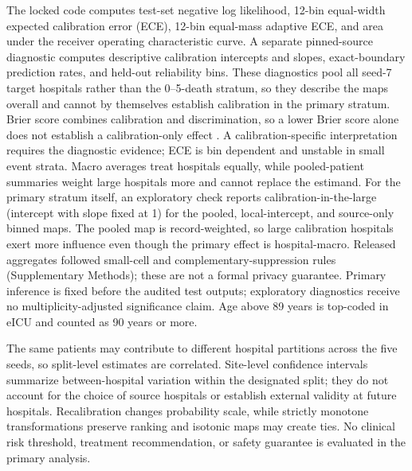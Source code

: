 \documentclass[11pt]{article}
\begin{document}
The locked code computes test-set negative log likelihood, 12-bin equal-width expected calibration error (ECE), 12-bin equal-mass adaptive ECE, and area under the receiver operating characteristic curve. A separate pinned-source diagnostic computes descriptive calibration intercepts and slopes, exact-boundary prediction rates, and held-out reliability bins. These diagnostics pool all seed-7 target hospitals rather than the 0--5-death stratum, so they describe the maps overall and cannot by themselves establish calibration in the primary stratum. Brier score combines calibration and discrimination, so a lower Brier score alone does not establish a calibration-only effect \cite{r3}. A calibration-specific interpretation requires the diagnostic evidence; ECE is bin dependent and unstable in small event strata. Macro averages treat hospitals equally, while pooled-patient summaries weight large hospitals more and cannot replace the estimand. For the primary stratum itself, an exploratory check reports calibration-in-the-large (intercept with slope fixed at 1)\cite{vancalster2016} for the pooled, local-intercept, and source-only binned maps. The pooled map is record-weighted, so large calibration hospitals exert more influence even though the primary effect is hospital-macro. Released aggregates followed small-cell and complementary-suppression rules (Supplementary Methods); these are not a formal privacy guarantee. Primary inference is fixed before the audited test outputs; exploratory diagnostics receive no multiplicity-adjusted significance claim. Age above 89 years is top-coded in eICU and counted as 90 years or more.

The same patients may contribute to different hospital partitions across the five seeds, so split-level estimates are correlated. Site-level confidence intervals summarize between-hospital variation within the designated split; they do not account for the choice of source hospitals or establish external validity at future hospitals. Recalibration changes probability scale, while strictly monotone transformations preserve ranking and isotonic maps may create ties. No clinical risk threshold, treatment recommendation, or safety guarantee is evaluated in the primary analysis.
\end{document}
